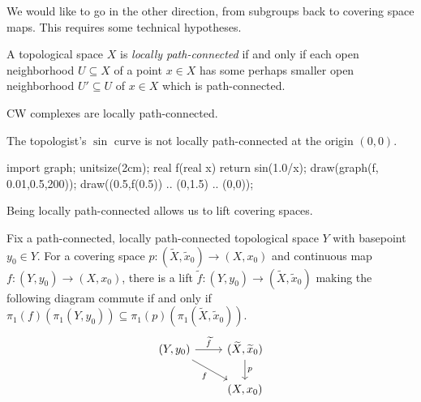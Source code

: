 \documentclass[../notes.tex]{subfiles}
\begin{document}
We would like to go in the other direction, from subgroups back to covering space maps. This requires some technical hypotheses.
\begin{definition}
	A topological space $X$ is \textit{locally path-connected} if and only if each open neighborhood $U\subseteq X$ of a point $x\in X$ has some perhaps smaller open neighborhood $U'\subseteq U$ of $x\in X$ which is path-connected.
\end{definition}
\begin{example}
	CW complexes are locally path-connected.
\end{example}
\begin{nex}
	The topologist's $\sin$ curve is not locally path-connected at the origin $(0,0)$.
	\begin{center}
		\begin{asy}
			import graph;
			unitsize(2cm);
			real f(real x)
			{
				return sin(1.0/x);
			}
			draw(graph(f, 0.01,0.5,200));
			draw((0.5,f(0.5)) .. (0,1.5) .. (0,0));
		\end{asy}
	\end{center}
\end{nex}
Being locally path-connected allows us to lift covering spaces.
\begin{proposition} \label{prop:lift-maps}
	Fix a path-connected, locally path-connected topological space $Y$ with basepoint $y_0\in Y$. For a covering space $p\colon(\widetilde X,\widetilde x_0)\to(X,x_0)$ and continuous map $f\colon(Y,y_0)\to(X,x_0)$, there is a lift $\widetilde f\colon(Y,y_0)\to(\widetilde X,\widetilde x_0)$ making the following diagram commute if and only if $\pi_1(f)(\pi_1(Y,y_0))\subseteq\pi_1(p)(\pi_1(\widetilde X,\widetilde x_0))$.
	\[\begin{tikzcd}
		{(Y,y_0)} & {(\widetilde X,\widetilde x_0)} \\
		& {(X,x_0)}
		\arrow["f"', from=1-1, to=2-2]
		\arrow["p", from=1-2, to=2-2]
		\arrow["{\widetilde f}", from=1-1, to=1-2]
	\end{tikzcd}\]
\end{proposition}
\end{document}
